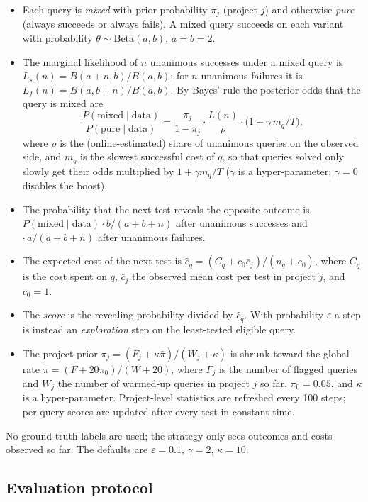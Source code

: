 \documentclass[11pt]{article}
\begin{document}
\begin{itemize}
  \item Each query is \emph{mixed} with prior probability $\pi_j$ (project $j$) and otherwise \emph{pure} (always succeeds or always fails). A mixed query succeeds on each variant with probability $\theta\sim\mathrm{Beta}(a,b)$, $a=b=2$.
  \item The marginal likelihood of $n$ unanimous successes under a mixed query is $L_s(n)=B(a{+}n,b)/B(a,b)$; for $n$ unanimous failures it is $L_f(n)=B(a,b{+}n)/B(a,b)$. By Bayes' rule the posterior odds that the query is mixed are
  \begin{equation}
  \frac{P(\text{mixed}\mid\text{data})}{P(\text{pure}\mid\text{data})}
  =\frac{\pi_j}{1-\pi_j}\cdot\frac{L(n)}{\rho}\cdot\bigl(1+\gamma\, m_q/T\bigr),
  \end{equation}
  where $\rho$ is the (online-estimated) share of unanimous queries on the observed side, and $m_q$ is the slowest successful cost of $q$, so that queries solved only slowly get their odds multiplied by $1+\gamma m_q/T$ ($\gamma$ is a hyper-parameter; $\gamma{=}0$ disables the boost).
  \item The probability that the next test reveals the opposite outcome is $P(\text{mixed}\mid\text{data})\cdot b/(a{+}b{+}n)$ after unanimous successes and $\cdot\,a/(a{+}b{+}n)$ after unanimous failures.
  \item The expected cost of the next test is $\hat c_q=(C_q+c_0\bar c_j)/(n_q+c_0)$, where $C_q$ is the cost spent on $q$, $\bar c_j$ the observed mean cost per test in project $j$, and $c_0=1$.
  \item The \emph{score} is the revealing probability divided by $\hat c_q$. With probability $\varepsilon$ a step is instead an \emph{exploration} step on the least-tested eligible query.
  \item The project prior $\pi_j=(F_j+\kappa\bar\pi)/(W_j+\kappa)$ is shrunk toward the global rate $\bar\pi=(F+20\pi_0)/(W+20)$, where $F_j$ is the number of flagged queries and $W_j$ the number of warmed-up queries in project $j$ so far, $\pi_0=0.05$, and $\kappa$ is a hyper-parameter. Project-level statistics are refreshed every 100 steps; per-query scores are updated after every test in constant time.
\end{itemize}
No ground-truth labels are used; the strategy only sees outcomes and costs observed so far. The defaults are $\varepsilon=0.1$, $\gamma=2$, $\kappa=10$.

\subsection{Evaluation protocol}
\label{sec:protocol}
\end{document}
